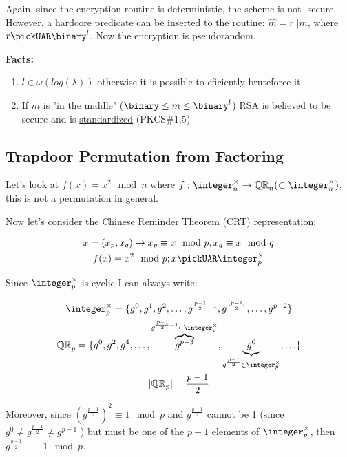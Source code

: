 Again, since the encryption routine is deterministic, the scheme is not \cpa-secure. However, a hardcore predicate can be inserted to the routine: $\hat{m} = r||m$, where $r \pickUAR \binary^l$. Now the encryption is pseudorandom.

\textbf{Facts:}
\begin{enumerate}
    \item $l \in \omega(log(\lambda))$ otherwise it is possible to eficiently bruteforce it.
    \item If $m$ is "in the middle" ($\binary \leq m \leq \binary^l$) RSA is believed to be secure and is \underline{standardized} (PKCS\#1,5)
\end{enumerate}


\subsection{Trapdoor Permutation from Factoring}
Let's look at $f(x) = x^2\mod{n}$ where $f: \integer_n^\times \to \QR[n] (\subset \integer_n^\times)$, this is not a permutation in general.

Now let's consider the Chinese Reminder Theorem (CRT) representation:

\begin{gather*}
    x=(x_p,x_q) \rightarrow x_p\equiv x\mod{p} , x_q\equiv x\mod{q}\\
    f(x)=x^2\mod{p}; x \pickUAR \integer_p^\times
\end{gather*}

Since $\integer_p^\times$ is cyclic I can always write:

\begin{gather*}
    \integer_p^\times = \{g^0,g^1,g^2,\ldots,g^{\frac{p-1}{2}-1},g^{\frac{(p-1)}{2}},\ldots,g^{p-2} \} \\
    \QR[p]=\{g^0,g^2,g^4,\ldots,\overbrace{g^{p-3}}^{g^{\frac{p-1}{2}-1} \in \integer_p^\times},\underbrace{g^0}_{g^{\frac{p-1}{2}} \in \integer_p^\times},\ldots\} \\
    |\QR[p]|=\frac{p-1}{2}
\end{gather*}

Moreover, since $(g^{\frac{p-1}{2}})^2 \equiv 1 \mod{p} $ and $g^{\frac{p-1}{2}}$ cannot be 1 (since $g^{0}\not=g^{\frac{p-1}{2}}\not=g^{p-1}$ ) but must be one of the $p-1$ elements of $\integer_p^\times$, then $g^{\frac{p-1}{2}} \equiv -1 \mod{p}$.

